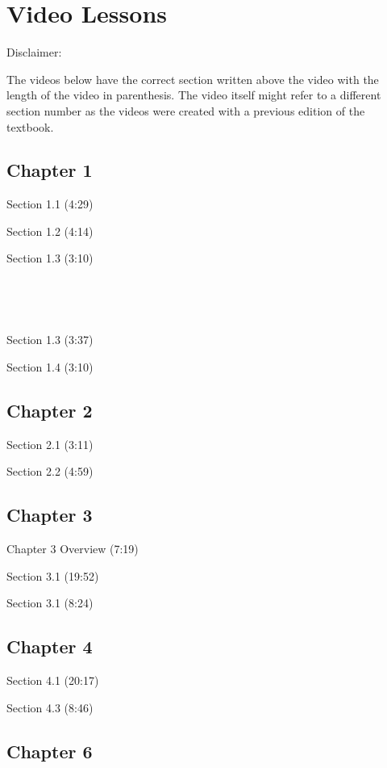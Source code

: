 \documentclass[
]{book}
\begin{document}
\hypertarget{vids}{%
\chapter{Video Lessons}\label{vids}}

Disclaimer:~

The videos below have the correct section written above the video with the length of the video in parenthesis. The video itself might refer to a different section number as the videos were created with a previous edition of the textbook.

\hypertarget{chapter-1}{%
\section{Chapter 1}\label{chapter-1}}

Section 1.1 (4:29)

Section 1.2 (4:14)

Section 1.3 (3:10)

~

~

Section 1.3 (3:37)

Section 1.4 (3:10)

\hypertarget{chapter-2}{%
\section{Chapter 2}\label{chapter-2}}

Section 2.1 (3:11)

Section 2.2 (4:59)

\hypertarget{chapter-3}{%
\section{Chapter 3}\label{chapter-3}}

Chapter 3 Overview (7:19)

Section 3.1 (19:52)

Section 3.1 (8:24)

\hypertarget{chapter-4}{%
\section{Chapter 4}\label{chapter-4}}

Section 4.1 (20:17)

Section 4.3 (8:46)

\hypertarget{chapter-6}{%
\section{Chapter 6}\label{chapter-6}}
\end{document}
